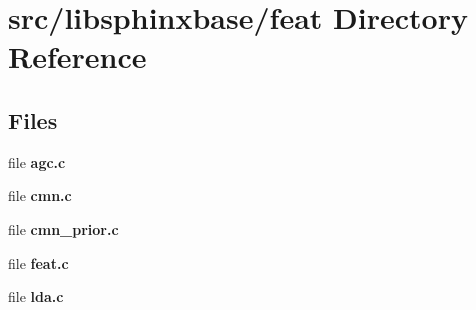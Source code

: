 \section{src/libsphinxbase/feat Directory Reference}
\label{dir_4d78eab29b32367e0c8277af3fb65de0}
\subsection*{Files}
\begin{DoxyCompactItemize}
\item 
file {\bfseries agc.\+c}
\item 
file {\bfseries cmn.\+c}
\item 
file {\bfseries cmn\+\_\+prior.\+c}
\item 
file {\bfseries feat.\+c}
\item 
file {\bfseries lda.\+c}
\end{DoxyCompactItemize}
